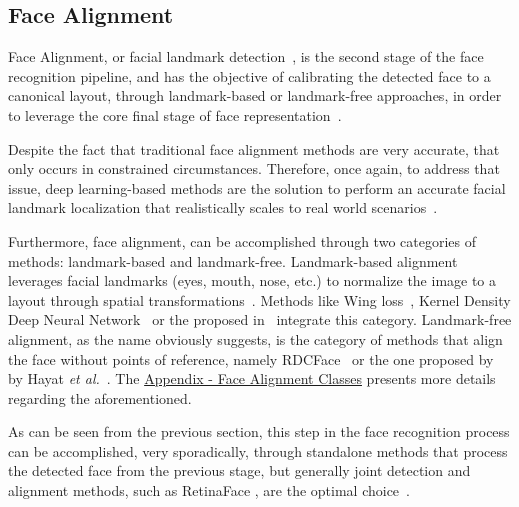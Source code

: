\documentclass[class=report, crop=false, a4paper, 12pt]{standalone}
\begin{document}
\subsection{Face Alignment}
\par Face Alignment, or facial landmark detection~\autocite{changFacePoseNetMakingCase2017}, is the second stage of the face recognition pipeline, and has the objective of calibrating the detected face to a canonical layout, through landmark-based or landmark-free approaches, in order to leverage the core final stage of face representation~\autocite{duElementsEndtoendDeep2022}. 
\par Despite the fact that traditional face alignment methods are very accurate, that only occurs in constrained circumstances. Therefore, once again, to address that issue, deep learning-based methods are the solution to perform an accurate facial landmark localization that realistically scales to real world scenarios~\autocite{fengWingLossRobust2018}. 
\par Furthermore, face alignment, can be accomplished through two categories of methods: landmark-based and landmark-free. Landmark-based alignment leverages facial landmarks (eyes, mouth, nose, etc.) to normalize the image to a layout through spatial transformations~\autocite{duElementsEndtoendDeep2022}. Methods like Wing loss~\autocite{fengWingLossRobust2018}, Kernel Density Deep Neural Network~\autocite{chenFaceAlignmentKernel2019} or the  proposed in~\autocite{xiaoRecurrent3D2DDual2017} integrate this category. Landmark-free alignment, as the name obviously suggests, is the category of methods that align the face without points of reference, namely RDCFace~\autocite{zhaoRDCFaceRadialDistortion2020} or the one proposed by by Hayat \textit{et al.}~\autocite{hayatJointRegistrationRepresentation2017}. The \hyperref[sec:face_alignment_appendix]{Appendix - Face Alignment Classes} presents more details regarding the aforementioned.

\vspace{0.7\baselineskip}
\par As can be seen from the previous section, this step in the face recognition process can be accomplished, very sporadically, through standalone methods that process the detected face from the previous stage, but generally joint detection and alignment methods, such as RetinaFace \autocite{dengRetinaFaceSinglestageDense2019}, are the optimal choice~\autocite{changFacePoseNetMakingCase2017}.
\end{document}
